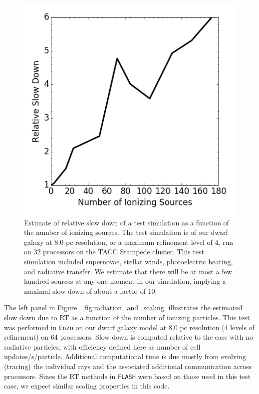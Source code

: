 \documentclass[11pt]{article}
\begin{document}
\begin{figure}
\centering
\includegraphics[width=0.45\linewidth]{enzo_radiation}
\caption{Estimate of relative slow down of a test simulation as a function of the number of ionizing sources. The test simulation is of our dwarf galaxy at 8.0 pc resolution, or a maximum refinement level of 4, run on 32 processors on the TACC Stampede cluster. This test simulation included supernovae, stellar winds, photoelectric heating, and radiative transfer. We estimate that there will be at most a few hundred sources at any one moment in our simulation, implying a maximal slow down of about a factor of 10.}
\label{fig:radiation}
\end{figure}

The left panel in Figure ~\ref{fig:radiation_and_scaling} illustrates the estimated slow down due to RT as a function of the number of ionizing particles. This test was performed in \texttt{Enzo} on our dwarf galaxy model at 8.0 pc resolution (4 levels of refinement) on 64 processors. Slow down is computed relative to the case with no radiative particles, with efficiency defined here as number of cell updates/s/particle. Additional computational time is due mostly from evolving (tracing) the individual rays and the associated additional communication across processors. Since the RT methods in \texttt{FLASH} were based on those used in this test case, we expect similar scaling properties in this code.

\end{document}
